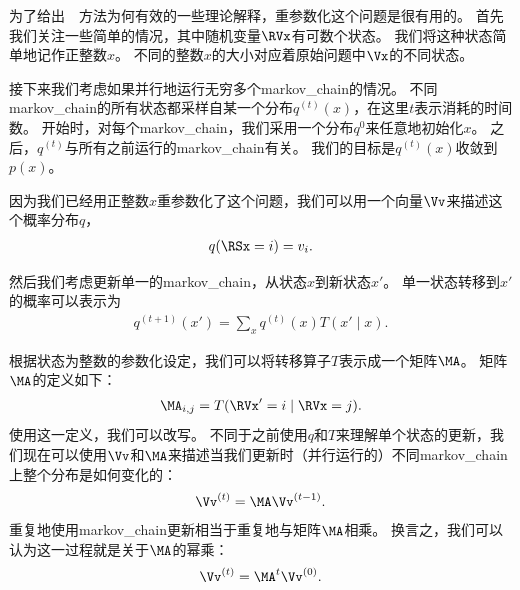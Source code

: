 为了给出~~方法为何有效的一些理论解释，重参数化这个问题是很有用的。 
首先我们关注一些简单的情况，其中随机变量$\RVx$有可数个状态。
我们将这种状态简单地记作正整数$x$。
不同的整数$x$的大小对应着原始问题中$\Vx$的不同状态。


接下来我们考虑如果并行地运行无穷多个\gls{markov_chain}的情况。  
不同\gls{markov_chain}的所有状态都采样自某一个分布$q^{(t)}(x)$，在这里$t$表示消耗的时间数。
开始时，对每个\gls{markov_chain}，我们采用一个分布$q^{{0}}$来任意地初始化$x$。  
之后，$q^{(t)}$与所有之前运行的\gls{markov_chain}有关。
我们的目标是$q^{(t)}(x)$收敛到$p(x)$。 


因为我们已经用正整数$x$重参数化了这个问题，我们可以用一个向量$\Vv$来描述这个概率分布$q$，  
\begin{align}
q(\RSx = i) = v_i.
\end{align}


然后我们考虑更新单一的\gls{markov_chain}，从状态$x$到新状态$x'$。
单一状态转移到$x'$的概率可以表示为
\begin{align}
\label{eqn:transition1}
q^{(t+1)}(x') = \sum_{x} q^{(t)}(x) T(x'\mid x).
\end{align}


根据状态为整数的参数化设定，我们可以将转移算子$T$表示成一个矩阵$\MA$。
矩阵$\MA$的定义如下：
\begin{align}
\MA_{i,j} = T(\RVx' = i\mid \RVx = j).
\end{align}
使用这一定义，我们可以改写。
不同于之前使用$q$和$T$来理解单个状态的更新，我们现在可以使用$\Vv$和$\MA$来描述当我们更新时（并行运行的）不同\gls{markov_chain}上整个分布是如何变化的： 
\begin{align}
\Vv^{(t)} = \MA \Vv^{(t-1)}.
\end{align}
重复地使用\gls{markov_chain}更新相当于重复地与矩阵$\MA$相乘。  
换言之，我们可以认为这一过程就是关于$\MA$的幂乘：  
\begin{align}
\Vv^{(t)} = \MA^{t} \Vv^{(0)}.
\end{align}


